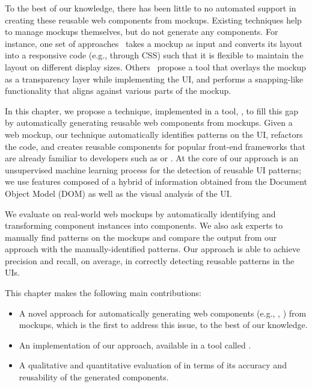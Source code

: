 To the best of our knowledge, there has been little to no automated support in creating these reusable web components from mockups. Existing techniques help to manage mockups themselves, but do not generate any components. For instance, one set of approaches~\cite{Sinha:2013:CompilingMockupsToFlexibleUIs, ramon2016layout} takes a mockup as input
and converts its layout into a responsive code (e.g., through CSS) such that it is flexible  to maintain the layout on different
display sizes. Others~\cite{mihalcea2014const_with_mockups} propose a tool that overlays the mockup as a transparency layer while implementing the UI, 
and performs a snapping-like functionality that aligns against various parts of the mockup.

In this chapter, we propose a technique, implemented in a tool, \toolname, to fill this gap by automatically generating reusable web components from mockups.
Given a web mockup, our technique automatically identifies patterns on the UI,  refactors the \html code, and creates reusable components for popular front-end frameworks that are already familiar to developers such as \react or \angular. At the core of our approach is an unsupervised machine learning process for the detection of reusable UI patterns; we use features composed of a hybrid of information obtained from the Document Object Model (DOM) 
as well as the visual analysis of the UI.

We evaluate \toolname on \numberOfTemplates real-world web mockups by automatically identifying and transforming \totalNumberOfComponentInstances component instances 
into \numberOfComponents components.    
We also ask \numberOfParticipants experts to manually
find patterns on the mockups
and compare the output from our approach with the manually-identified patterns.
Our approach is able to achieve \precision precision and \recall recall, on average, in correctly detecting reusable patterns in the UIs. 


This chapter makes the following main contributions:
\begin{itemize}
	\item A novel approach for automatically generating web components (e.g., \react, \angular) from mockups, which is the first to address this issue, to the best of our knowledge.
	\item An implementation of our approach, available in a tool called \toolname.
	\item A qualitative and quantitative evaluation of \toolname in terms of its accuracy and reusability of the generated components. 
	
\end{itemize}


 


